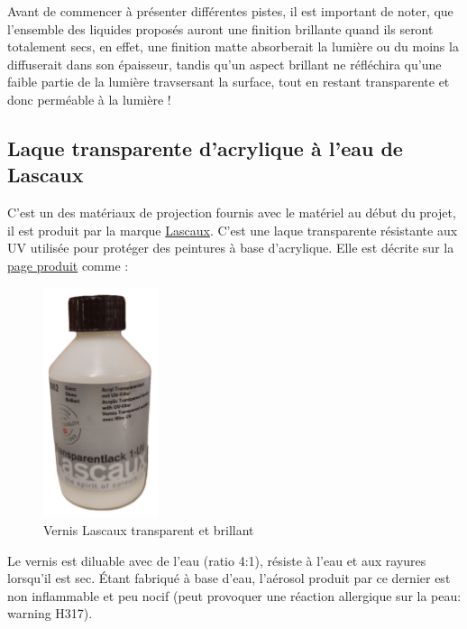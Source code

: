 Avant de commencer à présenter différentes pistes, il est important de noter, que l'ensemble des liquides proposés auront une finition brillante
quand ils seront totalement secs, en effet, une finition matte absorberait la lumière ou du moins la diffuserait dans son épaisseur, tandis qu'un aspect brillant
ne réfléchira qu'une faible partie de la lumière travsersant la surface, tout en restant transparente et donc perméable à la lumière !
\subsection{Laque transparente d'acrylique à l'eau de Lascaux}

C'est un des matériaux de projection fournis avec le matériel au début du projet, il est produit par la marque \href{https://lascaux.ch/en/start}{Lascaux}\footnotemark {}.
C'est une laque transparente résistante aux UV utilisée pour protéger des peintures à base d'acrylique. Elle est décrite sur la \href{https://lascaux.ch/lascaux-varnishes-and-fixative/lascaux-transparent-varnish-1-uv-gloss}{page produit}\footnotemark
comme :

\begin{figure}[H]
    \centering
    \includegraphics[width=0.3\textwidth]{assets/figures/etat_art/Lascaux_vernis_brillant.png}
    \caption[Vernis Lascaux transparant et brillant]{Vernis Lascaux transparent et brillant}
\end{figure}
Le vernis est diluable avec de l'eau (ratio 4:1), résiste à l'eau et aux rayures lorsqu'il est sec. Étant fabriqué à base d'eau,
l'aérosol produit par ce dernier est non inflammable et peu nocif (peut provoquer une réaction allergique sur la peau: warning H317).

